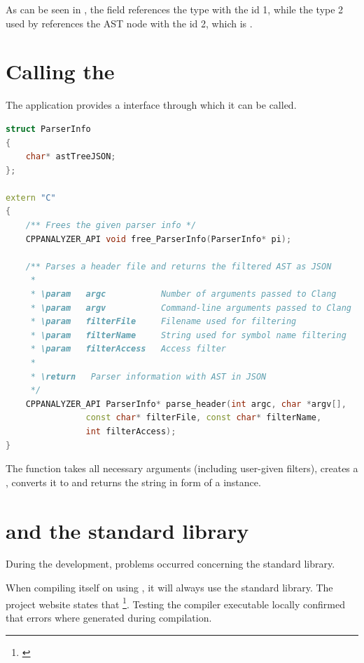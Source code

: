 As can be seen in , the field  references the type with the id 1, while the type 2 used by  references the AST node with the id 2, which is .

\newpage
\section{Calling the }
\label{sec:CallingCPPAnalyzer}

The  application provides a  interface through which it can be called.

\SingleSpacing
\begin{lstlisting}[language=C++, caption=\myProperName{CPPAnalyzer} \myProperName{C} API]
struct ParserInfo
{
	char* astTreeJSON;
};

extern "C"
{
	/** Frees the given parser info */
	CPPANALYZER_API void free_ParserInfo(ParserInfo* pi);

	/** Parses a header file and returns the filtered AST as JSON
	 *
	 * \param   argc           Number of arguments passed to Clang
	 * \param   argv           Command-line arguments passed to Clang
	 * \param   filterFile     Filename used for filtering
	 * \param   filterName     String used for symbol name filtering
	 * \param   filterAccess   Access filter
	 *
	 * \return   Parser information with AST in JSON
	 */
	CPPANALYZER_API ParserInfo* parse_header(int argc, char *argv[], 
				const char* filterFile, const char* filterName, 
				int filterAccess);
}
\end{lstlisting}
\OnehalfSpacing

The function  takes all necessary arguments (including user-given filters), creates a , converts it to  and returns the  string in form of a  instance.

\section{ and the  standard library}

During the development, problems occurred concerning the  standard library.

When compiling  itself on  using , it will always use the  standard library. The  project website states that \footnote{\citep{LLVMHPVS}}. Testing the  compiler executable locally confirmed that errors where generated during compilation.

